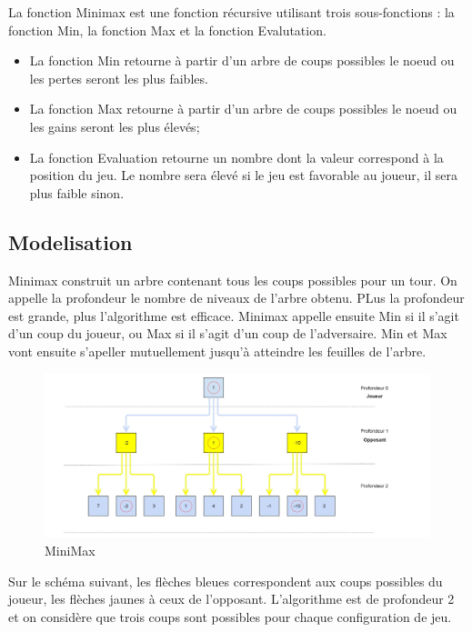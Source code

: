\documentclass[12pt]{article}
\begin{document}
La fonction Minimax est une fonction récursive utilisant trois
sous-fonctions : la fonction Min, la fonction Max et la fonction
Evalutation.

\begin{itemize}
\item
  La fonction Min retourne à partir d'un arbre de coups possibles le
  noeud ou les pertes seront les plus faibles.
\item
  La fonction Max retourne à partir d'un arbre de coups possibles le
  noeud ou les gains seront les plus élevés;
\item
  La fonction Evaluation retourne un nombre dont la valeur correspond à
  la position du jeu. Le nombre sera élevé si le jeu est favorable au
  joueur, il sera plus faible sinon.
\end{itemize}

\subsection{Modelisation}\label{modelisation}

Minimax construit un arbre contenant tous les coups possibles pour un
tour. On appelle la profondeur le nombre de niveaux de l'arbre obtenu.
PLus la profondeur est grande, plus l'algorithme est efficace. Minimax
appelle ensuite Min si il s'agit d'un coup du joueur, ou Max si il
s'agit d'un coup de l'adversaire. Min et Max vont ensuite s'apeller
mutuellement jusqu'à atteindre les feuilles de l'arbre.

\begin{figure}[htbp]
\centering
\includegraphics{images/minmax.jpg}
\caption{MiniMax}
\end{figure}

Sur le schéma suivant, les flèches bleues correspondent aux coups
possibles du joueur, les flèches jaunes à ceux de l'opposant.
L'algorithme est de profondeur 2 et on considère que trois coups sont
possibles pour chaque configuration de jeu.
\end{document}
